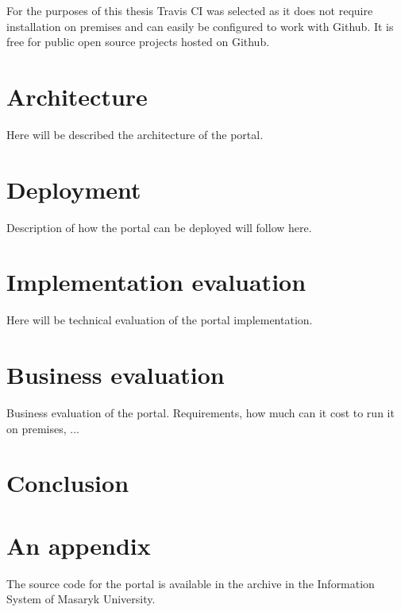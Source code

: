 \documentclass[
  digital, %
  table,   %
  lof,     %
  nolot,     %
]{fithesis3}
\begin{document}
For the purposes of this thesis Travis CI was selected as it does not require installation on premises and can easily be configured to work with Github. It is free for public open source projects hosted on Github.

\chapter{Architecture}
Here will be described the architecture of the portal.

\chapter{Deployment}
Description of how the portal can be deployed will follow here.

\chapter{Implementation evaluation}
Here will be technical evaluation of the portal implementation.

\chapter{Business evaluation}
Business evaluation of the portal. Requirements, how much can it cost to run it on premises, ...

\chapter{Conclusion}

\printbibliography[heading=bibintoc] %

\appendix %
\chapter{An appendix}
The source code for the portal is available in the archive in the Information System of Masaryk University.
\end{document}
